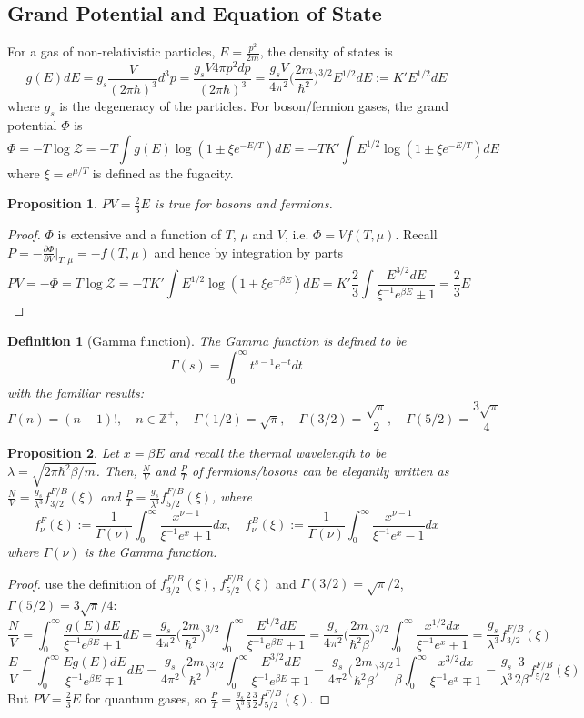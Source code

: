 \documentclass[a4paper]{article}
\theoremstyle{new}
\newtheorem{defi}{Definition}[section]
\newtheorem{prop}{Proposition}[section]
\begin{document}
\subsection{Grand Potential and Equation of State}
For a gas of non-relativistic particles, $E=\frac{p^2}{2m}$, the density of states is
$$g(E)dE=g_s\frac{V}{(2\pi\hbar)^3}d^3p=\frac{g_sV4\pi p^2dp}{(2\pi\hbar)^3}=\frac{g_sV}{4\pi^2}\bigg(\frac{2m}{\hbar^2}\bigg)^{3/2}E^{1/2}dE:=K'E^{1/2}dE$$
where $g_s$ is the degeneracy of the particles. For boson/fermion gases, the grand potential $\Phi$ is
$$\Phi=-T\log\mathcal{Z}=-T\int g(E)\log(1\pm\xi e^{-E/T})dE=-TK'\int E^{1/2}\log(1\pm\xi e^{-E/T})dE$$
where $\xi=e^{\mu/T}$ is defined as the fugacity. 
\begin{prop}
$PV=\frac{2}{3}E$ is true for bosons and fermions.
\end{prop}
\begin{proof}
$\Phi$ is extensive and a function of $T$, $\mu$ and $V$, i.e. $\Phi=Vf(T,\mu)$. Recall $P=-\frac{\partial\Phi}{\partial V}|_{T,\mu}=-f(T,\mu)$ and hence by integration by parts
$$PV=-\Phi=T\log\mathcal{Z}=-TK'\int E^{1/2}\log(1\pm\xi e^{-\beta E})dE=K'\frac{2}{3}\int\frac{E^{3/2}dE}{\xi^{-1}e^{\beta E}\pm1}=\frac{2}{3}E$$
\end{proof}
\begin{defi}[Gamma function]
The Gamma function is defined to be
$$\Gamma(s)=\int_0^\infty t^{s-1}e^{-t}dt$$
with the familiar results:
$$\Gamma(n)=(n-1)!,\quad n\in\mathbb{Z}^+,\quad\Gamma(1/2)=\sqrt{\pi},\quad\Gamma(3/2)=\frac{\sqrt{\pi}}{2},\quad\Gamma(5/2)=\frac{3\sqrt{\pi}}{4}$$
\end{defi}
\begin{prop}
Let $x=\beta E$ and recall the thermal wavelength to be $\lambda=\sqrt{2\pi\hbar^2\beta/m}$. Then, $\frac{N}{V}$ and $\frac{P}{T}$ of fermions/bosons can be elegantly written as $\frac{N}{V}=\frac{g_s}{\lambda^3}f_{3/2}^{F/B}(\xi)$ and $\frac{P}{T}=\frac{g_s}{\lambda^3}f_{5/2}^{F/B}(\xi)$, where
$$f_\nu^F(\xi):=\frac{1}{\Gamma(\nu)}\int_0^\infty\frac{x^{\nu-1}}{\xi^{-1}e^x+1}dx,\quad f_\nu^B(\xi):=\frac{1}{\Gamma(\nu)}\int_0^\infty\frac{x^{\nu-1}}{\xi^{-1}e^x-1}dx$$
where $\Gamma(\nu)$ is the Gamma function.
\end{prop}
\begin{proof}
use the definition of $f_{3/2}^{F/B}(\xi)$, $f_{5/2}^{F/B}(\xi)$ and $\Gamma(3/2)=\sqrt{\pi}/2$, $\Gamma(5/2)=3\sqrt{\pi}/4$:
$$\frac{N}{V}=\int_0^\infty\frac{g(E)dE}{\xi^{-1}e^{\beta E}\mp 1}dE=\frac{g_s}{4\pi^2}\bigg(\frac{2m}{\hbar^2}\bigg)^{3/2}\int_0^\infty\frac{E^{1/2}dE}{\xi^{-1}e^{\beta E}\mp 1}=\frac{g_s}{4\pi^2}\bigg(\frac{2m}{\hbar^2\beta}\bigg)^{3/2}\int_0^\infty\frac{x^{1/2}dx}{\xi^{-1}e^x\mp 1}=\frac{g_s}{\lambda^3}f_{3/2}^{F/B}(\xi)$$
$$\frac{E}{V}=\int_0^\infty\frac{Eg(E)dE}{\xi^{-1}e^{\beta E}\mp 1}dE=\frac{g_s}{4\pi^2}\bigg(\frac{2m}{\hbar^2}\bigg)^{3/2}\int_0^\infty\frac{E^{3/2}dE}{\xi^{-1}e^{\beta E}\mp 1}=\frac{g_s}{4\pi^2}\bigg(\frac{2m}{\hbar^2\beta}\bigg)^{3/2}\frac{1}{\beta}\int_0^\infty\frac{x^{3/2}dx}{\xi^{-1}e^x\mp 1}=\frac{g_s}{\lambda^3}\frac{3}{2\beta}f_{5/2}^{F/B}(\xi)$$
But $PV=\frac{2}{3}E$ for quantum gases, so $\frac{P}{T}=\frac{g_s}{\lambda^3}\frac{2}{3}\frac{3}{2}f_{5/2}^{F/B}(\xi)$.
\end{proof}
\end{document}
